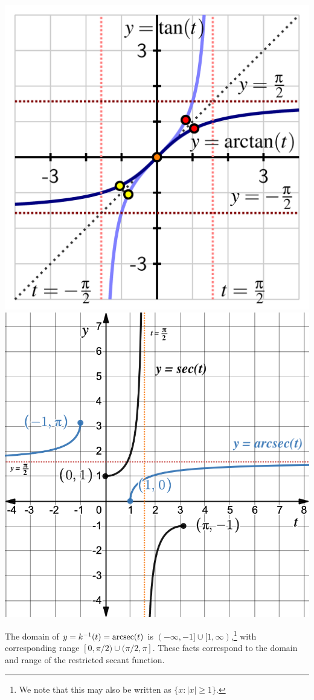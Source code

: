 \documentclass{ximera}
\begin{document}
\begin{summary}
\begin{itemize}
\begin{image}
\includegraphics[width = .49\linewidth]{inverse-trig-arctan-graph.png}
\includegraphics[width=.49\linewidth]{secArcsecGraphst.png}
\end{image}
\par
The domain of $y = k^{-1}(t) = \operatorname{arcsec}(t)$ is $(-\infty,-1] \cup [1,\infty)$,\footnote{We note that this may also be written as $\{x: |x| \geq 1\}$.} with corresponding range $[0,\pi/2) \cup (\pi/2, \pi]$. These facts correspond to the domain and range of the restricted secant function.
%
\end{itemize}
\end{summary}
\end{document}
